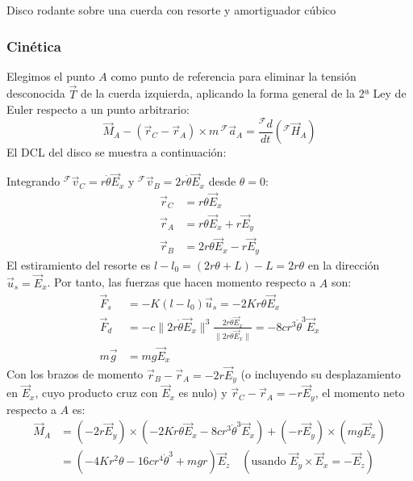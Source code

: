\begin{solucion}{Disco rodante sobre una cuerda con resorte y amortiguador cúbico}
\subsubsection*{Cinética}

Elegimos el punto $A$ como punto de referencia para eliminar la tensión desconocida $\vec{T}$ de la cuerda izquierda, aplicando la forma general de la 2ª Ley de Euler respecto a un punto arbitrario:
\begin{equation}
    \vec{M}_A - (\vec{r}_C - \vec{r}_A) \times m\,{}^{\mathcal{F}}\vec{a}_A = \frac{{}^{\mathcal{F}}d}{dt}({}^{\mathcal{F}}\vec{H}_A) \label{eq:c4_e01_p21_euler}
\end{equation}
El DCL del disco se muestra a continuación:

\begin{center}
\end{center}

Integrando ${}^{\mathcal{F}}\vec{v}_C = r\dot{\theta}\vec{E}_x$ y ${}^{\mathcal{F}}\vec{v}_B = 2r\dot{\theta}\vec{E}_x$ desde $\theta = 0$:
\begin{align}
    \vec{r}_C &= r\theta\vec{E}_x \\
    \vec{r}_A &= r\theta\vec{E}_x + r\vec{E}_y \\
    \vec{r}_B &= 2r\theta\vec{E}_x - r\vec{E}_y
\end{align}
El estiramiento del resorte es $l - l_0 = (2r\theta + L) - L = 2r\theta$ en la dirección $\vec{u}_s = \vec{E}_x$. Por tanto, las fuerzas que hacen momento respecto a $A$ son:
\begin{align}
    \vec{F}_s &= -K(l - l_0)\vec{u}_s = -2Kr\theta\vec{E}_x \\
    \vec{F}_d &= -c\|2r\dot{\theta}\vec{E}_x\|^3 \frac{2r\dot{\theta}\vec{E}_x}{\|2r\dot{\theta}\vec{E}_x\|} = -8cr^3\dot{\theta}^3\vec{E}_x \\
    m\vec{g} &= mg\vec{E}_x
\end{align}
Con los brazos de momento $\vec{r}_B - \vec{r}_A = -2r\vec{E}_y$ (o incluyendo su desplazamiento en $\vec{E}_x$, cuyo producto cruz con $\vec{E}_x$ es nulo) y $\vec{r}_C - \vec{r}_A = -r\vec{E}_y$, el momento neto respecto a $A$ es:
\begin{align}
    \vec{M}_A &= (-2r\vec{E}_y) \times (-2Kr\theta\vec{E}_x - 8cr^3\dot{\theta}^3\vec{E}_x) + (-r\vec{E}_y) \times (mg\vec{E}_x) \nonumber \\
    &= (-4Kr^2\theta - 16cr^4\dot{\theta}^3 + mgr)\vec{E}_z \quad (\text{usando } \vec{E}_y \times \vec{E}_x = -\vec{E}_z)
\end{align}


\end{solucion}
